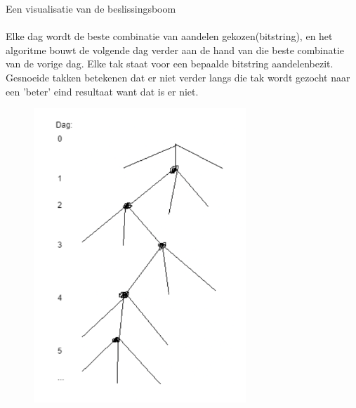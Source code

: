 \documentclass{article}
\begin{document}
\newpage
Een visualisatie van de beslissingsboom\\\\
Elke dag wordt de beste combinatie van aandelen gekozen(bitstring), en het algoritme bouwt de volgende dag verder aan de hand van die beste combinatie van de vorige dag. Elke tak staat voor een bepaalde bitstring aandelenbezit. Gesnoeide takken betekenen dat er niet verder langs die tak wordt gezocht naar een 'beter' eind resultaat want dat is er niet.
\begin{figure}[htp]
    \centering
    \includegraphics[width=8cm]{algo3/testtt.png}
    \label{fig:galaxy}
\end{figure}
\newpage
\end{document}
